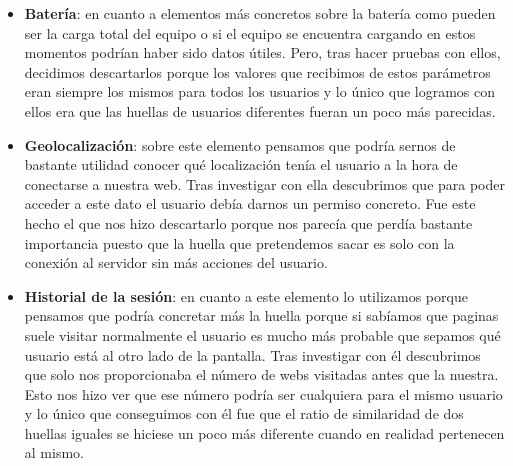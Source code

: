 \begin{itemize}
    \item \textbf{Batería}: en cuanto a elementos más concretos sobre la batería como pueden ser la carga total del equipo o si el equipo se encuentra cargando en estos momentos podrían haber sido datos útiles. Pero, tras hacer pruebas con ellos, decidimos descartarlos porque los valores que recibimos de estos parámetros eran siempre los mismos para todos los usuarios y lo único que logramos con ellos era que las huellas de usuarios diferentes fueran un poco más parecidas. 
    \item \textbf{Geolocalización}: sobre este elemento pensamos que podría sernos de bastante utilidad conocer qué localización tenía el usuario a la hora de conectarse a nuestra web. Tras investigar con ella descubrimos que para poder acceder a este dato el usuario debía darnos un permiso concreto. Fue este hecho el que nos hizo descartarlo porque nos parecía que perdía bastante importancia puesto que la huella que pretendemos sacar es solo con la conexión al servidor sin más acciones del usuario.
    \item \textbf{Historial de la sesión}: en cuanto a este elemento lo utilizamos porque pensamos que podría concretar más la huella porque si sabíamos que paginas suele visitar normalmente el usuario es mucho más probable que sepamos qué usuario está al otro lado de la pantalla. Tras investigar con él descubrimos que solo nos proporcionaba el número de webs visitadas antes que la nuestra. Esto nos hizo ver que ese número podría ser cualquiera para el mismo usuario y lo único que conseguimos con él fue que el ratio de similaridad de dos huellas iguales se hiciese un poco más diferente cuando en realidad pertenecen al mismo.
\end{itemize}